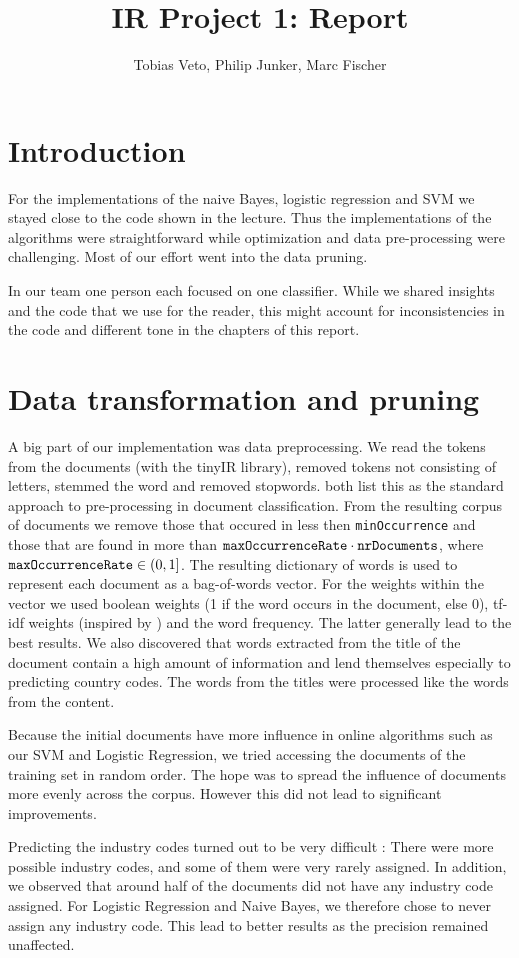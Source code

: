 \documentclass{article}
\title{IR Project 1: Report}
\author{Tobias Veto, Philip Junker, Marc Fischer}
\begin{document}
\section*{Introduction}
For the implementations of the naive Bayes, logistic regression and SVM we stayed close to the code shown in the lecture. Thus the implementations of the algorithms were straightforward while optimization and data pre-processing were challenging. Most of our effort went into the data pruning.

In our team one person each focused on one classifier. While we shared insights and the code that we use for the reader, this might account for inconsistencies in the code and different tone in the chapters of this report.

\section*{Data transformation and pruning}
A big part of our implementation was data preprocessing. We read the tokens from the documents (with the tinyIR library), removed tokens not consisting of letters, stemmed the word and removed stopwords. \cite{joachims_text_1998,ozgur_text_2005} both list this as the standard approach to pre-processing in document classification. From the resulting corpus of documents we remove those that occured in less then \texttt{minOccurrence} and those that are found in more than $\text{\texttt{maxOccurrenceRate}} \cdot \text{\texttt{nrDocuments}}$, where $\text{\texttt{maxOccurrenceRate}} \in (0, 1]$.
The resulting dictionary of words is used to represent each document as a bag-of-words vector. For the weights within the vector we used boolean weights (1 if the word occurs in the document, else 0), tf-idf weights (inspired by \cite{ozgur_text_2005}) and the word frequency. The latter generally lead to the best results.
We also discovered  that words extracted from the title of the document contain a high amount of information and lend themselves especially to predicting country codes. The words from the titles were processed like the words from the content.

Because the initial documents have more influence in online algorithms such as our SVM and Logistic Regression, we tried accessing the documents of the training set in random order. The hope was to spread the influence of documents more evenly across the corpus. However this did not lead to significant improvements.

Predicting the industry codes turned out to be very difficult : There were more possible industry codes, and some of them were very rarely assigned.  In addition, we observed that around half of the documents did not have any industry code assigned. For Logistic Regression and Naive Bayes, we therefore chose to never assign any industry code. This lead to better results as the precision remained unaffected.
\end{document}
